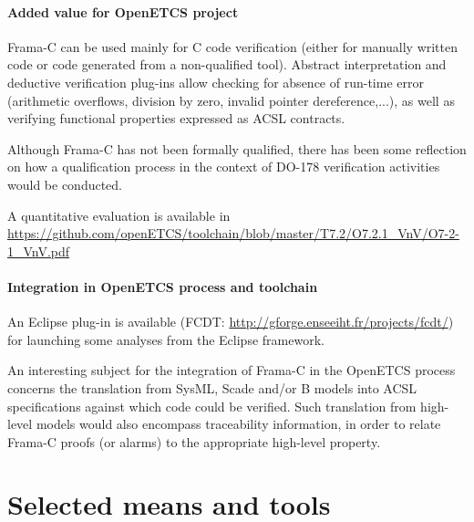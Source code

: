 \paragraph{Added value for OpenETCS project}

Frama-C can be used mainly for C code verification (either for manually written
code or code generated from a non-qualified tool). Abstract interpretation
and deductive verification plug-ins allow checking for absence of run-time
error (arithmetic overflows, division by zero, invalid pointer
dereference,...), as well as verifying functional properties expressed as
ACSL contracts.

Although Frama-C has not been formally qualified, there has been some reflection
on how a qualification process in the context of DO-178 verification activities
would be conducted.

A quantitative evaluation is available in \url{https://github.com/openETCS/toolchain/blob/master/T7.2/O7.2.1_VnV/O7-2-1_VnV.pdf}

\paragraph{Integration in OpenETCS process and toolchain}

An Eclipse plug-in is available 
(FCDT: \url{http://gforge.enseeiht.fr/projects/fcdt/}) for launching some
analyses from the Eclipse framework.

An interesting subject for the integration of Frama-C in the OpenETCS process
concerns the translation from SysML, Scade and/or B models into ACSL
specifications against which code could be verified. Such translation from
high-level models would also encompass traceability information, in order to
relate Frama-C proofs (or alarms) to the appropriate high-level property.

\section{Selected means and tools}

\begin{comment}
To complete after decision meeting with a section for each tool with the following contents:

\begin{itemize}
\item description of the means or tools, references and links
\item added value for openETCS
\item for which tasks and how (input/output/actions) is the mean or tools used.
\end{itemize}
\end{comment}

